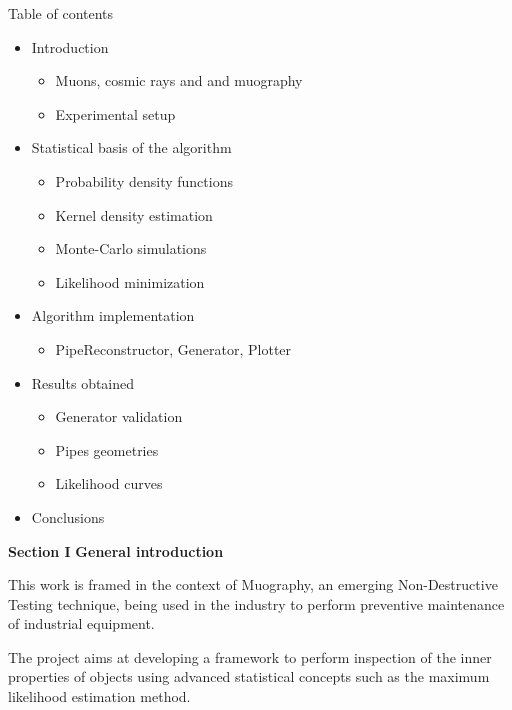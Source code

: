 \documentclass[8 pt]{beamer}
\begin{document}
\begin{frame}{Table of contents}

	\begin{itemize}
		\item Introduction
		\begin{itemize}
			\item Muons, cosmic rays and and muography
			\item Experimental setup
		\end{itemize} \vfill
		\item Statistical basis of the algorithm
		\begin{itemize}
			\item Probability density functions
			\item Kernel density estimation
			\item Monte-Carlo simulations
			\item Likelihood minimization
		\end{itemize} \vfill
		\item Algorithm implementation
		\begin{itemize}
			\item PipeReconstructor, Generator, Plotter
		\end{itemize} \vfill
		\item Results obtained
		\begin{itemize}
			\item Generator validation
			\item Pipes geometries
			\item Likelihood curves
		\end{itemize} \vfill
		\item Conclusions \vfill
	\end{itemize}

\end{frame}






\begin{frame}{}
	\centering
	\huge{\textbf{\color{mycolor} Section I}} \newline
	\LARGE{\textbf{\color{mycolor} General introduction \color{black}}} \vfill
	
	\LARGE{\textbf{\color{black} \color{black}}}\newline \vspace{10pt} \Large{This work is framed in the context of Muography, an emerging Non-Destructive Testing technique, being used in the industry to perform preventive maintenance of industrial equipment. \\ \vspace{10pt}

The project aims at developing a framework to perform inspection of the inner properties of objects using advanced statistical concepts such as the maximum likelihood estimation method.} \vfill
\end{frame}
\end{document}
